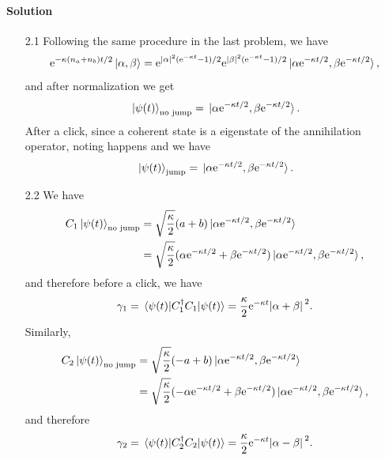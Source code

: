 \documentclass[hyperref, a4paper]{article}
\newcommand*{\ee}{\mathrm{e}}
\begin{document}
\paragraph{Solution} \begin{itemize}
\item[2.1] Following the same procedure in the last problem, we have 
\[
    \ee^{- \kappa (n_a + n_b) t / 2} \ket*{\alpha, \beta} = \ee^{\abs*{\alpha}^2 (\ee^{-\kappa t} - 1) / 2} \ee^{\abs*{\beta}^2 (\ee^{-\kappa t} - 1) / 2} \ket*{\alpha \ee^{- \kappa t / 2}, \beta \ee^{- \kappa t / 2}}, 
\] 
and after normalization we get 
\begin{equation}
    \ket*{\psi(t)}_\text{no jump} = \ket*{\alpha \ee^{- \kappa t / 2}, \beta \ee^{- \kappa t / 2}}.
\end{equation}
After a click, since a coherent state is a eigenstate of the annihilation operator, noting happens and we have 
\begin{equation}
    \ket*{\psi(t)}_\text{jump} = \ket*{\alpha \ee^{- \kappa t / 2}, \beta \ee^{- \kappa t / 2}}.
\end{equation}
\item[2.2] We have 
\[
    \begin{aligned}
        C_1 \ket*{\psi(t)}_\text{no jump} &= \sqrt{\frac{\kappa}{2}} (a + b) \ket*{\alpha \ee^{- \kappa t / 2}, \beta \ee^{- \kappa t / 2}} \\
        &= \sqrt{\frac{\kappa}{2}} (\alpha \ee^{- \kappa t / 2} + \beta \ee^{- \kappa t / 2}) \ket*{\alpha \ee^{- \kappa t / 2}, \beta \ee^{- \kappa t / 2}},
    \end{aligned}
\] 
and therefore before a click, we have 
\begin{equation}
    \gamma_1 = \expval*{C_1^\dagger C_1}{\psi(t)} = \frac{\kappa}{2} \ee^{- \kappa t} \abs*{\alpha + \beta}^2.
\end{equation}
Similarly, 
\[
    \begin{aligned}
        C_2 \ket*{\psi(t)}_\text{no jump} &= \sqrt{\frac{\kappa}{2}} (- a + b) \ket*{\alpha \ee^{- \kappa t / 2}, \beta \ee^{- \kappa t / 2}} \\
        &= \sqrt{\frac{\kappa}{2}} (- \alpha \ee^{- \kappa t / 2} + \beta \ee^{- \kappa t / 2}) \ket*{\alpha \ee^{- \kappa t / 2}, \beta \ee^{- \kappa t / 2}},
    \end{aligned}
\]
and therefore 
\begin{equation}
    \gamma_2 = \expval*{C_2^\dagger C_2}{\psi(t)} = \frac{\kappa}{2} \ee^{- \kappa t} \abs*{\alpha - \beta}^2.
\end{equation}

\end{itemize}
\end{document}
